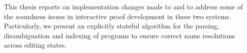 This thesis reports on implementation changes made to \Beluga and \Harpoon to address some of the soundness issues in interactive proof development in these two systems.
Particularly, we present an explicitly stateful algorithm for the parsing, disambiguation and indexing of \Beluga programs to ensure correct name resolutions across editing states.

